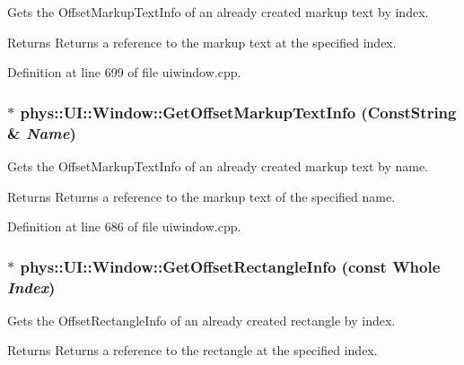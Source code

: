 Gets the OffsetMarkupTextInfo of an already created markup text by index. 

\begin{DoxyReturn}{Returns}
Returns a reference to the markup text at the specified index. 
\end{DoxyReturn}


Definition at line 699 of file uiwindow.cpp.

\hypertarget{classphys_1_1UI_1_1Window_a9906bb131f631af0a9aed7dbb7744112}{
\subsubsection[{GetOffsetMarkupTextInfo}]{ $\ast$ phys::UI::Window::GetOffsetMarkupTextInfo ({\bf ConstString} \& {\em Name})}}
\label{d4/d86/classphys_1_1UI_1_1Window_a9906bb131f631af0a9aed7dbb7744112}


Gets the OffsetMarkupTextInfo of an already created markup text by name. 

\begin{DoxyReturn}{Returns}
Returns a reference to the markup text of the specified name. 
\end{DoxyReturn}


Definition at line 686 of file uiwindow.cpp.

\hypertarget{classphys_1_1UI_1_1Window_aa39dd6dba9202cc9c0e8bd52efd53cba}{
\subsubsection[{GetOffsetRectangleInfo}]{ $\ast$ phys::UI::Window::GetOffsetRectangleInfo (const {\bf Whole} {\em Index})}}
\label{d4/d86/classphys_1_1UI_1_1Window_aa39dd6dba9202cc9c0e8bd52efd53cba}


Gets the OffsetRectangleInfo of an already created rectangle by index. 

\begin{DoxyReturn}{Returns}
Returns a reference to the rectangle at the specified index. 
\end{DoxyReturn}



